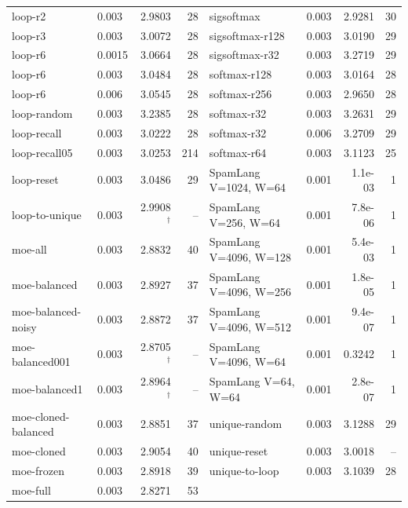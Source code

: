 \begin{center}
\begin{tabular}{llrr @{\hspace{2em}} llrr}
loop-r2 & 0.003 & 2.9803 & 28 & sigsoftmax & 0.003 & 2.9281 & 30 \\
loop-r3 & 0.003 & 3.0072 & 28 & sigsoftmax-r128 & 0.003 & 3.0190 & 29 \\
loop-r6 & 0.0015 & 3.0664 & 28 & sigsoftmax-r32 & 0.003 & 3.2719 & 29 \\
loop-r6 & 0.003 & 3.0484 & 28 & softmax-r128 & 0.003 & 3.0164 & 28 \\
loop-r6 & 0.006 & 3.0545 & 28 & softmax-r256 & 0.003 & 2.9650 & 28 \\
loop-random & 0.003 & 3.2385 & 28 & softmax-r32 & 0.003 & 3.2631 & 29 \\
loop-recall & 0.003 & 3.0222 & 28 & softmax-r32 & 0.006 & 3.2709 & 29 \\
loop-recall05 & 0.003 & 3.0253 & 214 & softmax-r64 & 0.003 & 3.1123 & 25 \\
loop-reset & 0.003 & 3.0486 & 29 & SpamLang V=1024, W=64 & 0.001 & 1.1e-03 & 1 \\
loop-to-unique & 0.003 & 2.9908$^\dagger$ & -- & SpamLang V=256, W=64 & 0.001 & 7.8e-06 & 1 \\
moe-all & 0.003 & 2.8832 & 40 & SpamLang V=4096, W=128 & 0.001 & 5.4e-03 & 1 \\
moe-balanced & 0.003 & 2.8927 & 37 & SpamLang V=4096, W=256 & 0.001 & 1.8e-05 & 1 \\
moe-balanced-noisy & 0.003 & 2.8872 & 37 & SpamLang V=4096, W=512 & 0.001 & 9.4e-07 & 1 \\
moe-balanced001 & 0.003 & 2.8705$^\dagger$ & -- & SpamLang V=4096, W=64 & 0.001 & 0.3242 & 1 \\
moe-balanced1 & 0.003 & 2.8964$^\dagger$ & -- & SpamLang V=64, W=64 & 0.001 & 2.8e-07 & 1 \\
moe-cloned-balanced & 0.003 & 2.8851 & 37 & unique-random & 0.003 & 3.1288 & 29 \\
moe-cloned & 0.003 & 2.9054 & 40 & unique-reset & 0.003 & 3.0018 & -- \\
moe-frozen & 0.003 & 2.8918 & 39 & unique-to-loop & 0.003 & 3.1039 & 28 \\
moe-full & 0.003 & 2.8271 & 53 &  &  &  &  \\
\bottomrule\end{tabular}\end{center}